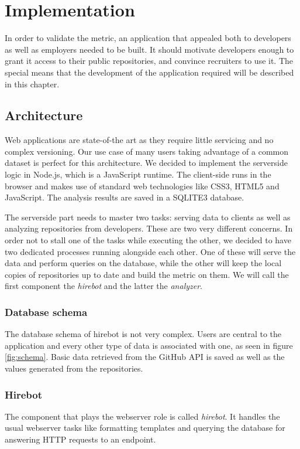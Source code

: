 \chapter{Implementation}\label{ch:implementation}
In order to validate the metric, an application that appealed both to developers as well as employers needed to be built. It should motivate developers enough to grant it access to their public repositories, and convince recruiters to use it. The special means that the development of the application required will be described in this chapter.

\section{Architecture}
Web applications are state-of-the art as they require little servicing and no complex versioning. Our use case of many users taking advantage of a common dataset is perfect for this architecture. We decided to implement the serverside logic in Node.js, which is a JavaScript runtime. The client-side runs in the browser and makes use of standard web technologies like CSS3, HTML5 and JavaScript. The analysis results are saved in a SQLITE3 database.
\newline

The serverside part needs to master two tasks: serving data to clients as well as analyzing repositories from developers. These are two very different concerns. In order not to stall one of the tasks while executing the other, we decided to have two dedicated processes running alongside each other. One of these will serve the data and perform queries on the database, while the other will keep the local copies of repositories up to date and build the metric on them. We will call the first component the \textit{hirebot} and the latter the \textit{analyzer}.

\subsection{Database schema}
The database schema of hirebot is not very complex. Users are central to the application and every other type of data is associated with one, as seen in figure \ref{fig:schema}. Basic data retrieved from the GitHub API is saved as well as the values generated from the repositories.

\subsection{Hirebot}
The component that plays the webserver role is called \textit{hirebot}. It handles the usual webserver tasks like formatting templates and querying the database for answering HTTP requests to an endpoint.
\newline

